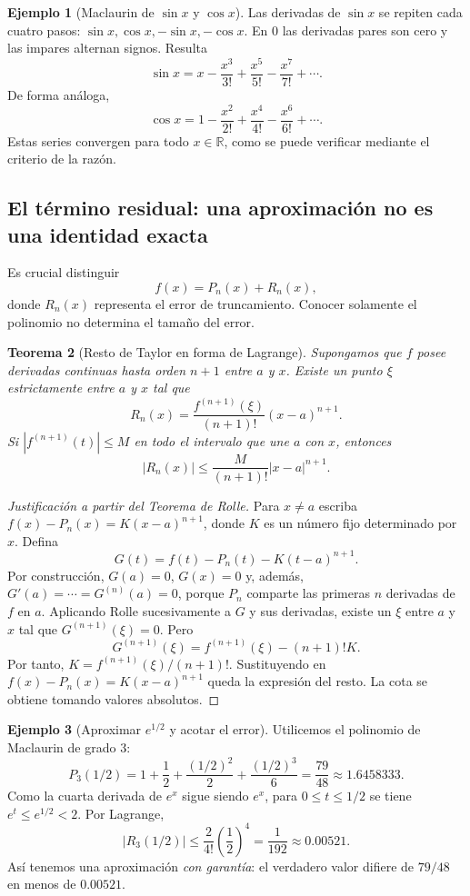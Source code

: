 \documentclass[12pt]{article}
\newtheorem{teorema}{Teorema}[section]
\theoremstyle{definition}
\newtheorem{ejemplo}[teorema]{Ejemplo}
\theoremstyle{remark}
\newcommand{\R}{\mathbb{R}}
\begin{document}
\begin{ejemplo}[Maclaurin de $\sin x$ y $\cos x$]
Las derivadas de $\sin x$ se repiten cada cuatro pasos: $\sin x,\cos x,-\sin x,-\cos x$. En $0$ las derivadas pares son cero y las impares alternan signos. Resulta
\[\boxed{\sin x=x-\frac{x^3}{3!}+\frac{x^5}{5!}-\frac{x^7}{7!}+\cdots}.\]
De forma análoga,
\[\boxed{\cos x=1-\frac{x^2}{2!}+\frac{x^4}{4!}-\frac{x^6}{6!}+\cdots}.\]
Estas series convergen para todo $x\in\R$, como se puede verificar mediante el criterio de la razón.
\end{ejemplo}

\subsection*{El término residual: una aproximación no es una identidad exacta}
Es crucial distinguir
\[f(x)=P_n(x)+R_n(x),\]
donde $R_n(x)$ representa el error de truncamiento. Conocer solamente el polinomio no determina el tamaño del error.
\begin{teorema}[Resto de Taylor en forma de Lagrange]
Supongamos que $f$ posee derivadas continuas hasta orden $n+1$ entre $a$ y $x$. Existe un punto $\xi$ estrictamente entre $a$ y $x$ tal que
\[\boxed{R_n(x)=\frac{f^{(n+1)}(\xi)}{(n+1)!}(x-a)^{n+1}.}\]
Si $|f^{(n+1)}(t)|\le M$ en todo el intervalo que une $a$ con $x$, entonces
\[\boxed{|R_n(x)|\le\frac{M}{(n+1)!}|x-a|^{n+1}.}\]
\end{teorema}
\begin{proof}[Justificación a partir del Teorema de Rolle]
Para $x\ne a$ escriba $f(x)-P_n(x)=K(x-a)^{n+1}$, donde $K$ es un número fijo determinado por $x$. Defina
\[G(t)=f(t)-P_n(t)-K(t-a)^{n+1}.\]
Por construcción, $G(a)=0$, $G(x)=0$ y, además, $G'(a)=\cdots=G^{(n)}(a)=0$, porque $P_n$ comparte las primeras $n$ derivadas de $f$ en $a$. Aplicando Rolle sucesivamente a $G$ y sus derivadas, existe un $\xi$ entre $a$ y $x$ tal que $G^{(n+1)}(\xi)=0$. Pero
\[G^{(n+1)}(\xi)=f^{(n+1)}(\xi)-(n+1)!K.\]
Por tanto, $K=f^{(n+1)}(\xi)/(n+1)!$. Sustituyendo en $f(x)-P_n(x)=K(x-a)^{n+1}$ queda la expresión del resto. La cota se obtiene tomando valores absolutos.
\end{proof}
\begin{ejemplo}[Aproximar $e^{1/2}$ y acotar el error]
Utilicemos el polinomio de Maclaurin de grado $3$:
\[P_3(1/2)=1+\frac12+\frac{(1/2)^2}{2}+\frac{(1/2)^3}{6}
=\boxed{\frac{79}{48}\approx1.6458333}.\]
Como la cuarta derivada de $e^x$ sigue siendo $e^x$, para $0\le t\le1/2$ se tiene $e^t\le e^{1/2}<2$. Por Lagrange,
\[|R_3(1/2)|\le\frac{2}{4!}\left(\frac12\right)^4
=\boxed{\frac1{192}\approx0.00521}.\]
Así tenemos una aproximación \emph{con garantía}: el verdadero valor difiere de $79/48$ en menos de $0.00521$.
\end{ejemplo}
\end{document}
